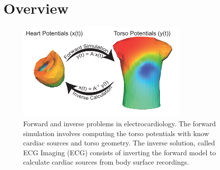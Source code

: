 \chapter{Overview}

\begin{figure}
    \begin{center}
    \includegraphics[width=0.75\textwidth]{ECGToolkitGuide_figures/fwd_inv_diag.pdf}
    \caption{Forward and inverse problems in electrocardiology.  The forward simulation involves 
        computing the torso potentials with know cardiac sources and torso geometry.  The inverse 
        solution, called ECG Imaging (ECG) consists of inverting the forward model to calculate cardiac
        sources from body surface recordings.}
    \label{fig:fwdinv_diag}
    \end{center}
    \end{figure}
    
